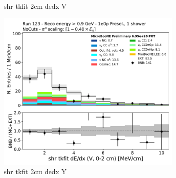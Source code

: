 \begin{figure}[H]
\begin{subfigure}{0.3\textwidth}
    \caption{shr tkfit 2cm dedx V}
    \end{subfigure}
    \begin{subfigure}{0.3\textwidth}
    \includegraphics[width=1.0\textwidth]{1e0p/High_E_Sideband/shr_tkfit_2cm_dedx_V.pdf}
    \caption{shr tkfit 2cm dedx Y}
    \end{subfigure}
    \caption{} 
    \label{fig:HE_1eNp_1}
\end{figure}

